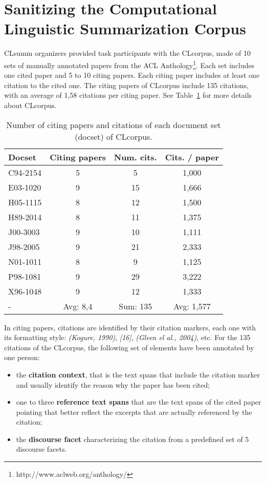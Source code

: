 \documentclass[11pt]{article}
\begin{document}
\section{Sanitizing the Computational Linguistic Summarization Corpus}
\label{sec:corpusSanitize}
CLsumm organizers provided task participants with the CLcorpus, made of 10 sets of manually annotated papers from the ACL Anthology\footnote{http://www.aclweb.org/anthology/}. Each set includes one cited paper and 5 to 10 citing papers. Each citing paper includes at least one citation to the cited one. The citing papers of CLcorpus include 135 citations, with an average of 1,58 citations per citing paper. See Table~\ref{table:corpusStats} for more details about CLcorpus.

\begin{table}[h]\footnotesize
  \begin{center}
  \begin{tabular}{ l | c | c | c }
    \hline
    Docset & Citing papers & Num. cits. & Cits. / paper \\ \hline
    C94-2154 & 5 & 5 & 1,000 \\ \hline
    E03-1020 & 9 & 15 & 1,666 \\ \hline
    H05-1115 & 8 & 12 & 1,500 \\ \hline
    H89-2014 & 8 & 11 & 1,375 \\ \hline
    J00-3003 & 9 & 10 & 1,111 \\ \hline
    J98-2005 & 9 & 21 & 2,333 \\ \hline
    N01-1011 & 8 & 9 & 1,125 \\ \hline
    P98-1081 & 9 & 29 & 3,222  \\ \hline
    X96-1048 & 9 & 12 & 1,333 \\ \hline
    - & Avg: 8,4 & Sum: 135 & Avg: 1,577  \\ \hline
    \hline
  \end{tabular}
  \caption{Number of citing papers and citations of each document set (docset) of CLcorpus.}
  \label{table:corpusStats}
  \end{center}
\end{table}

In citing papers, citations are identified by their citation markers, each one with its formatting style: \textit{(Kogure, 1990)}, \textit{[16]}, \textit{(Gleen el al., 2004)}, etc.
For the 135 citations of the CLcorpus, the following set of elements have been annotated by one person:
\begin{itemize}
\item the \textbf{citation context}, that is the text spans that include the citation marker and usually identify the reason why the paper has been cited;
\item one to three \textbf{reference text spans} that are the text spans of the cited paper pointing that better reflect the excerpts that are actually referenced by the citation;  
\item the \textbf{discourse facet} characterizing the citation from a predefined set of 5 discourse facets.
\end{itemize}
\end{document}
